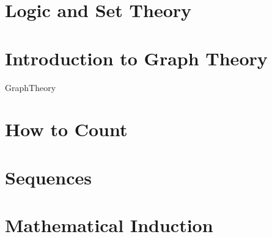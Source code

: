 \documentclass[12pt, oneside]{book}
\begin{document}




%


\chapter[Logic]{Logic and Set Theory}


%


%

\chapter[Graph Theory]{Introduction to Graph Theory}

{GraphTheory}


\chapter[Counting]{How to Count}


%


%


%


\chapter[Sequences]{Sequences}


%


%


\chapter[Induction]{Mathematical Induction}



\end{document}
